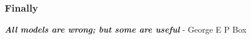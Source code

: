 %


\begin{frame}[fragile]\frametitle{Finally}
\vspace{0.8in}
{\em \bf All models are wrong; but some are useful}
- George E P Box
\end{frame}


